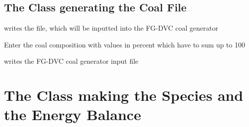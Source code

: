 \documentclass[letterpaper,10pt,english]{sphinxmanual}
\begin{document}
\subsection{The Class generating the Coal File}
\label{FGDVCClasses:the-class-generating-the-coal-file}

\begin{fulllineitems}
\label{FGDVCClasses:ReadInputFiles.WriteFGDVCCoalFile}
writes the file, which will be inputted into the FG-DVC coal generator

\begin{fulllineitems}
\label{FGDVCClasses:ReadInputFiles.WriteFGDVCCoalFile.setCoalComp}
Enter the coal composition with values in percent which have to sum up to 100

\end{fulllineitems}


\begin{fulllineitems}
\label{FGDVCClasses:ReadInputFiles.WriteFGDVCCoalFile.write}
writes the FG-DVC coal generator input file

\end{fulllineitems}


\end{fulllineitems}



\section{The Class making the Species and the Energy Balance}
\label{FGDVCClasses:the-class-making-the-species-and-the-energy-balance}
\end{document}
